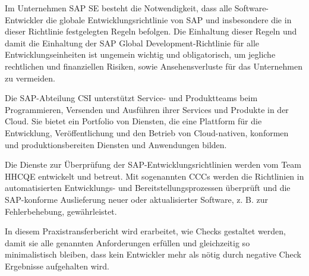 \documentclass[../main.tex]{subfiles}
\begin{document}
Im Unternehmen SAP SE besteht die Notwendigkeit, dass alle Software-Entwickler die globale Entwicklungsrichtlinie von SAP und insbesondere die in dieser Richtlinie festgelegten Regeln befolgen. 
Die Einhaltung dieser Regeln und damit die Einhaltung der SAP Global Development-Richtlinie für alle Entwicklungseinheiten ist ungemein wichtig und obligatorisch, um jegliche rechtlichen und finanziellen Risiken, sowie Ansehensverluste für das Unternehmen zu vermeiden.

Die SAP-Abteilung \gls{CSI} unterstützt Service- und Produktteams beim Programmieren, Versenden und Ausführen ihrer Services und Produkte in der Cloud.
Sie bietet ein Portfolio von Diensten, die eine Plattform für die Entwicklung, Veröffentlichung und den Betrieb von Cloud-nativen, konformen und produktionsbereiten Diensten und Anwendungen bilden.

Die Dienste zur Überprüfung der SAP-Entwicklungsrichtlinien werden vom Team \gls{HHCQE} entwickelt und betreut.
Mit sogenannten \glspl{CCC} werden die Richtlinien in automatisierten Entwicklungs- und Bereitstellungsprozessen überprüft und die SAP-konforme Auslieferung neuer oder aktualisierter Software, z. B. zur Fehlerbehebung, gewährleistet. 

In diesem Praxistransferbericht wird erarbeitet, wie Checks gestaltet werden, damit sie alle genannten Anforderungen erfüllen und gleichzeitig so minimalistisch bleiben, dass kein Entwickler mehr als nötig durch negative Check Ergebnisse aufgehalten wird. 
\end{document}
